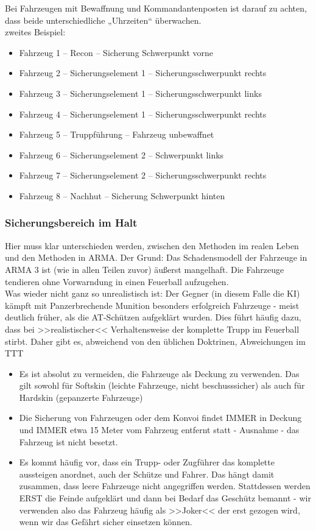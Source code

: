	Bei Fahrzeugen mit Bewaffnung und Kommandantenposten ist darauf zu achten, dass beide unterschiedliche „Uhrzeiten“ überwachen. \\
	zweites Beispiel:

	\begin{itemize}
		\item Fahrzeug 1 – Recon – Sicherung Schwerpunkt vorne
		\item Fahrzeug 2 – Sicherungselement 1 – Sicherungsschwerpunkt rechts
		\item Fahrzeug 3 – Sicherungselement 1 – Sicherungsschwerpunkt links
		\item Fahrzeug 4 – Sicherungselement 1 – Sicherungsschwerpunkt rechts
		\item Fahrzeug 5 – Truppführung – Fahrzeug unbewaffnet
		\item Fahrzeug 6 – Sicherungselement 2 – Schwerpunkt links
		\item Fahrzeug 7 – Sicherungselement 2 – Sicherungsschwerpunkt rechts
		\item Fahrzeug 8 – Nachhut – Sicherung Schwerpunkt hinten
	\end{itemize}

\subsubsection{Sicherungsbereich im Halt}
	Hier muss klar unterschieden werden, zwischen den Methoden im  realen Leben und den Methoden in ARMA. Der Grund: Das Schadensmodell der Fahrzeuge in ARMA 3 ist (wie in allen Teilen zuvor) äußerst mangelhaft. Die Fahrzeuge tendieren ohne Vorwarndung in einen Feuerball aufzugehen. \\
	Was wieder nicht ganz so unrealistisch ist: Der Gegner (in diesem Falle die KI) kämpft mit Panzerbrechende Munition besonders erfolgreich Fahrzeuge - meist deutlich früher, als die AT-Schützen aufgeklärt wurden. Dies führt häufig dazu, dass bei >>realistischer<< Verhaltensweise der komplette Trupp im Feuerball stirbt. Daher gibt es, abweichend von den üblichen Doktrinen, Abweichungen im TTT 

	\begin{itemize}
		\item Es ist absolut zu vermeiden, die Fahrzeuge als Deckung zu verwenden. Das gilt sowohl für Softskin (leichte Fahrzeuge, nicht beschusssicher) als auch für Hardskin (gepanzerte Fahrzeuge)
		\item Die Sicherung von Fahrzeugen oder dem Konvoi findet IMMER in Deckung und IMMER etwa 15 Meter vom Fahrzeug entfernt statt - Ausnahme - das Fahrzeug ist nicht besetzt.
		\item Es kommt häufig vor, dass ein Trupp- oder Zugführer das komplette aussteigen anordnet, auch der Schütze und Fahrer. Das hängt damit zusammen, dass leere Fahrzeuge nicht angegriffen werden. Stattdessen werden ERST die Feinde aufgeklärt und dann bei Bedarf das Geschütz bemannt - wir verwenden also das Fahrzeug häufig als >>Joker<<  der erst gezogen wird, wenn wir das Gefährt sicher einsetzen können.
	\end{itemize}

